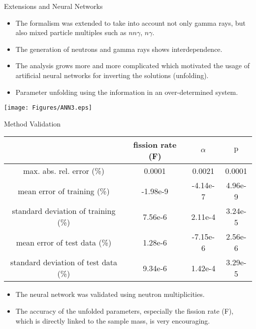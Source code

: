 \documentclass[clock,style=horatio,paper=screen,blackslide,trans=Wipe,mode=present]{powerdot}
\begin{document}
\begin{slide}{Extensions and Neural Networks}
\begin{itemize}
    \item The formalism was extended to take into account not
        only gamma rays, but also mixed particle multiples
        such as $nn\gamma$, $n\gamma$. \\[2mm]
    \item The generation of neutrons and gamma rays shows
        interdependence. \\[2mm]
    \item The analysis grows more and more complicated which
        motivated the usage of artificial neural networks for inverting the solutions (unfolding). \\[2mm]
    \item Parameter unfolding using the information in an
        over-determined system. \\[2mm]
\end{itemize}
\vspace{-1mm} \centering
\texttt{[image: Figures/ANN3.eps]}
\end{slide}


\begin{wideslide}{Method Validation}

\begin{table}[!hbt]%
\centering
\begin{tabular}{c||c|c|c}
  & fission rate (F) & $\alpha$  &  $\mathrm{p}$   \\     \hline \hline
  max. abs. rel. error (\%) & 0.0001 & 0.0021  & 0.0001  \\  \hline
  mean error of training (\%) & -1.98e-9 & -4.14e-7  & 4.96e-9  \\  \hline
  standard deviation of training (\%) & 7.56e-6 & 2.11e-4  & 3.24e-5  \\   \hline
  mean error of test data (\%) & 1.28e-6 & -7.15e-6  & 2.56e-6  \\  \hline
  standard deviation of test data (\%) & 9.34e-6 & 1.42e-4  & 3.29e-5  \\
\end{tabular}
\end{table}
{\vspace{3mm}\begin{itemize}
\item The neural network was validated using neutron
    multiplicities.
\vspace{3mm}
\item The accuracy of the unfolded parameters, especially the
    fission rate (F), which is directly linked to the sample mass, is very encouraging.
\end{itemize}}
\end{wideslide}
\end{document}
